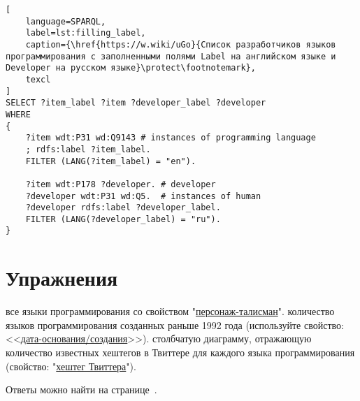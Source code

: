 \begin{lstlisting}[
	language=SPARQL,
	label=lst:filling_label,
	caption={\href{https://w.wiki/uGo}{Список разработчиков языков программирования с заполненными полями Label на английском языке и Developer на русском языке}\protect\footnotemark},
	texcl
]
SELECT ?item_label ?item ?developer_label ?developer
WHERE
{
    ?item wdt:P31 wd:Q9143 # instances of programming language
    ; rdfs:label ?item_label. 
    FILTER (LANG(?item_label) = "en"). 

    ?item wdt:P178 ?developer. # developer 
    ?developer wdt:P31 wd:Q5.  # instances of human
    ?developer rdfs:label ?developer_label. 
    FILTER (LANG(?developer_label) = "ru").  
}
\end{lstlisting}

\section{Упражнения}
\label{prog_lang_test}
\begin{enumerate}
	 все языки программирования со свойством "\href{https://www.wikidata.org/wiki/Property:P822}{персонаж-талисман}".
	 количество языков программирования созданных раньше 1992 года (используйте свойство: <<\href{https://www.wikidata.org/wiki/Property:P571}{дата-основания/создания}>>).
	 столбчатую диаграмму, отражающую количество известных хештегов в Твиттере для каждого языка программирования (свойство: "\href{https://www.wikidata.org/wiki/Property:P2572}{хештег Твиттера}").
\end{enumerate}

Ответы можно найти на странице~\pageref{answer:prog_langs_4}.